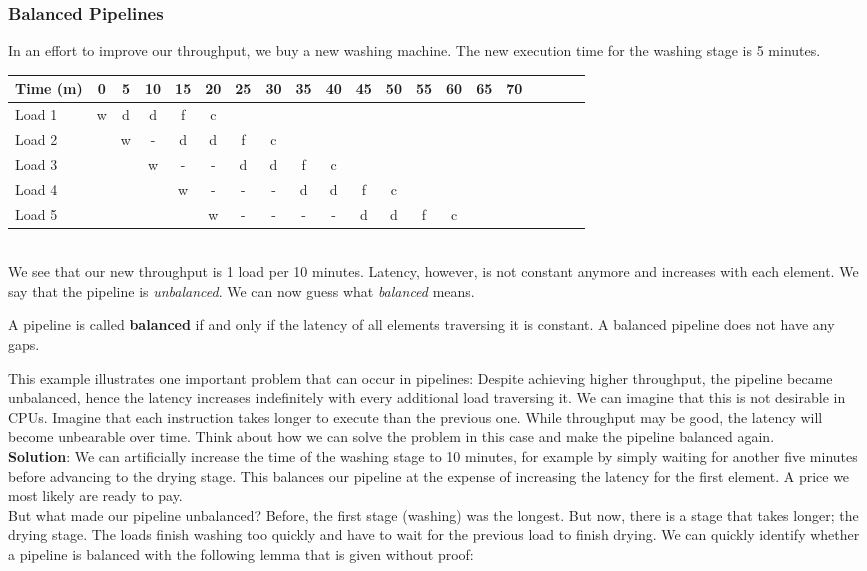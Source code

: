 \documentclass[main.tex]{subfiles}
\begin{document}
\subsubsection{Balanced Pipelines}
In an effort to improve our throughput, we buy a new washing machine. The new execution time for the washing stage is 5 minutes.\\[3mm]
\begin{tabular}{l | *{19}{c}}
    Time (m) & 0 & 5 & 10 & 15 & 20 & 25 & 30 & 35 & 40 & 45 & 50 & 55 & 60 & 65 & 70\\
    \hline
    Load 1 & w & d & d & f & c\\
    Load 2 &   & w & - & d & d & f & c\\
    Load 3 &   &   & w & - & - & d & d & f & c \\
    Load 4 &   &   &   & w & - & - & - & d & d & f & c \\
    Load 5 &   &   &   &   & w & - & - & - & - & d & d & f & c
\end{tabular} \\[3mm]
\noindent We see that our new throughput is 1 load per 10 minutes. Latency, however, is not constant anymore and increases with each element. We say that the pipeline is \textit{unbalanced}. We can now guess what \textit{balanced} means.
\begin{definition}
  A pipeline is called \textbf{balanced} if and only if the latency of all elements traversing it is constant. A balanced pipeline does not have any gaps.
\end{definition}
This example illustrates one important problem that can occur in pipelines: Despite achieving higher throughput, the pipeline became unbalanced, hence the latency increases indefinitely with every additional load traversing it. We can imagine that this is not desirable in CPUs. Imagine that each instruction takes longer to execute than the previous one. While throughput may be good, the latency will become unbearable over time. Think about how we can solve the problem in this case and make the pipeline balanced again.\\[3mm]
\textbf{Solution}: We can artificially increase the time of the washing stage to 10 minutes, for example by simply waiting for another five minutes before advancing to the drying stage. This balances our pipeline at the expense of increasing the latency for the first element. A price we most likely are ready to pay.\\[3mm]
But what made our pipeline unbalanced? Before, the first stage (washing) was the longest. But now, there is a stage that takes longer; the drying stage. The loads finish washing too quickly and have to wait for the previous load to finish drying. We can quickly identify whether a pipeline is balanced with the following lemma that is given without proof:
\end{document}
